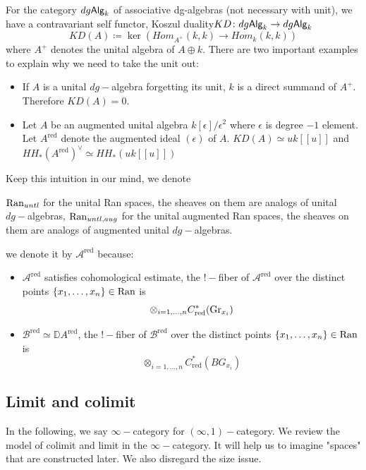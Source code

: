 \documentclass[oneside]{amsart}
\begin{document}
For the category $dg\mathsf{Alg}_k$ of associative dg-algebras (not necessary with unit), we have a contravariant self functor, Koszul duality\(
       KD\colon dg\Alg^{}_k \to dg\Alg^{}_k\)
        \[
            KD(A) \coloneqq \ker(Hom_{A^+}(k,k) \to Hom_k(k,k))
        \]  
        where $A^+$ denotes the unital algebra of $A \oplus k$. 
There are two important examples to explain why we need to take the unit out:
\begin{itemize}
    \item If $A$ is a unital $dg-$algebra forgetting its unit, $k$ is a direct summand of $A^+$. Therefore $KD(A) = 0$.
    \item Let $A$ be an augmented unital algebra $k[\epsilon]/\epsilon^2$ where $\epsilon$ is degree $-1$ element. Let $A^{\mathrm{red}}$ denote the augmented ideal $(\epsilon)$ of $A$. $KD(A) \simeq uk[[u]]$ and $HH_*(A^{\mathrm{red}})^\vee \simeq HH_*(uk[[u]])$
\end{itemize}

Keep this intuition in our mind, we denote 
\begin{notation}
    $\operatorname{Ran}_{untl}$ for the unital Ran spaces, the sheaves on them are analogs of unital $dg-$algebras,
    $\operatorname{Ran}_{untl,aug}$ for the unital augmented Ran spaces, the sheaves on them are analogs of augmented unital $dg-$algebras.
\end{notation}

we denote it by $\mathcal A^{\mathrm{red}}$ because: 
\begin{itemize}
    \item $\mathcal A^{\mathrm{\mathrm{red}}}$ satisfies cohomological estimate, the $!-$fiber of $\mathcal A^{\mathrm{red}}$ over the distinct points $\{ x_1, \dots ,x_n\} \in \operatorname{Ran}$ is \[  
        \otimes_{i=1,\dots, n} C^*_{\mathrm{red}}(\operatorname{Gr}_{x_i})
    \]
    \item $\mathcal B^{\mathrm{red}} \simeq \mathbb{D} A^{\mathrm{red}}$, the $!-$fiber of $\mathcal B^{\mathrm{red}}$ over the distinct points $\{ x_1, \dots ,x_n\} \in \operatorname{Ran}$ is\[   
    \otimes_{i= 1, \dots, n} C_{\mathrm{red}}^*(BG_{x_i})
    \]
\end{itemize}

\subsection{Limit and colimit}
In the following, we say $\infty-$category for $(\infty,1)-$category.
We review the model of colimit and limit in the $\infty-$category. It will help us to imagine  "spaces" that are constructed later. We also disregard the size issue.
\end{document}
